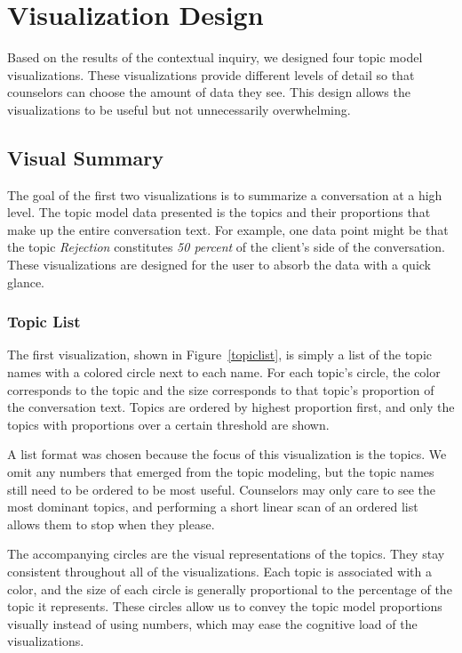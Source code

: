 \chapter{Visualization Design}

Based on the results of the contextual inquiry, we designed four topic model visualizations. These visualizations provide different levels of detail so that counselors can choose the amount of data they see. This design allows the visualizations to be useful but not unnecessarily overwhelming.

\section{Visual Summary}

The goal of the first two visualizations is to summarize a conversation at a high level. The topic model data presented is the topics and their proportions that make up the entire conversation text. For example, one data point might be that the topic \textit{Rejection} constitutes \textit{50 percent} of the client's side of the conversation. These visualizations are designed for the user to absorb the data with a quick glance.

\subsection{Topic List}

The first visualization, shown in Figure~\ref{topiclist}, is simply a list of the topic names with a colored circle next to each name. For each topic's circle, the color corresponds to the topic and the size corresponds to that topic's proportion of the conversation text. Topics are ordered by highest proportion first, and only the topics with proportions over a certain threshold are shown.

A list format was chosen because the focus of this visualization is the topics. We omit any numbers that emerged from the topic modeling, but the topic names still need to be ordered to be most useful. Counselors may only care to see the most dominant topics, and performing a short linear scan of an ordered list allows them to stop when they please.

The accompanying circles are the visual representations of the topics. They stay consistent throughout all of the visualizations. Each topic is associated with a color, and the size of each circle is generally proportional to the percentage of the topic it represents. These circles allow us to convey the topic model proportions visually instead of using numbers, which may ease the cognitive load of the visualizations.

